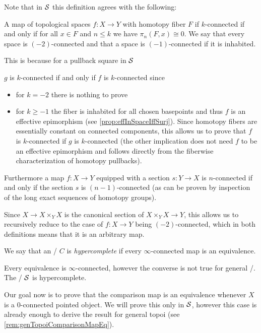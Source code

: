 \begin{remark}
    Note that in $\mathcal{S}$ this definition agrees with the following:
    \begin{definition*}
        A map of topological spaces $f\colon X\to Y$ with homotopy fiber $F$ if $k$-connected if and only if for all $x\in F$ and $n\leq k$ we have $\pi_n(F,x)\cong 0$.
        We say that every space is $(-2)$-connected and that a space is $(-1)$-connected if it is inhabited.
    \end{definition*}
    This is because for a pullback square in $\mathcal{S}$ 
    \begin{center}
    \end{center}
    $g$ is $k$-connected if and only if $f$ is $k$-connected since
    \begin{itemize}
        \item for $k=-2$ there is nothing to prove
        \item for $k\geq -1$ the fiber is inhabited for all chosen basepoints and thus $f$ is an effective epimorphism (see \cref{prop:effInSpaceIffSurj}).
            Since homotopy fibers are essentially constant on connected components, this allows us to prove that $f$ is $k$-connected if $g$ is $k$-connected (the other implication does not need $f$ to be an effective epimorphism and follows directly from the fiberwise characterization of homotopy pullbacks). %
    \end{itemize}
    
    Furthermore a map $f\colon X\to Y$ equipped with a section $s\colon Y\to X$ is $n$-connected if and only if the section $s$ is $(n-1)$-connected (as can be proven by inspection of the long exact sequences of homotopy groups).
    
    Since $X\to X\times_YX$ is the canonical section of $X\times_{Y} X\to Y$, this allows us to recursively reduce to the case of $f\colon X\to Y$ being $(-2)$-connected, which in both definitions means that it is an arbitrary map.
\end{remark}
\begin{definition}
    We say that an \inftytop/ $C$ is \emph{hypercomplete} if every $\infty$-connected map is an equivalence.
\end{definition}
\begin{remark}
    Every equivalence is $\infty$-connected, however the converse is not true for general \inftytops/.
    The \inftytop/ $\mathcal{S}$ is hypercomplete. %
\end{remark}
Our goal now is to prove that the comparison map is an equivalence whenever $X$ is a $0$-connected pointed object. %
We will prove this only in $\mathcal{S}$, however this case is already enough to derive the result for general topoi (see \cref{rem:genTopoiComparisonMapEq}).

